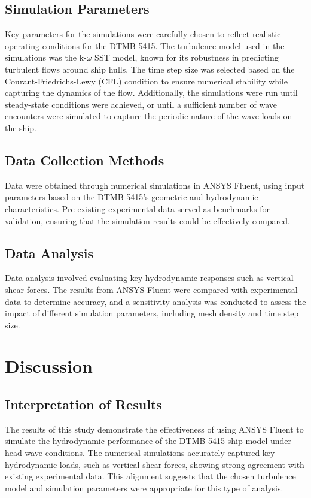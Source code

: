 \documentclass[12pt]{article} %
\begin{document}
\subsection{Simulation Parameters}
Key parameters for the simulations were carefully chosen to reflect realistic operating conditions 
for the DTMB 5415. The turbulence model used in the simulations was the k-$\omega$ SST model, known for its 
robustness in predicting turbulent flows around ship hulls. The time step size was selected based on 
the Courant-Friedrichs-Lewy (CFL) condition to ensure numerical stability while capturing the dynamics 
of the flow. Additionally, the simulations were run until steady-state conditions were achieved, or until 
a sufficient number of wave encounters were simulated to capture the periodic nature of the wave loads 
on the ship.

\subsection{Data Collection Methods}
Data were obtained through numerical simulations in ANSYS Fluent, using input parameters based on the 
DTMB 5415’s geometric and hydrodynamic characteristics. Pre-existing experimental data served as 
benchmarks for validation, ensuring that the simulation results could be effectively compared.

\subsection{Data Analysis}
Data analysis involved evaluating key hydrodynamic responses such as vertical shear forces. The results from ANSYS Fluent were compared with experimental data to determine accuracy, 
and a sensitivity analysis was conducted to assess the impact of different simulation parameters, 
including mesh density and time step size.








\clearpage
\section{Discussion}

\subsection{Interpretation of Results}
The results of this study demonstrate the effectiveness of using ANSYS Fluent to simulate the 
hydrodynamic performance of the DTMB 5415 ship model under head wave conditions. The numerical 
simulations accurately captured key hydrodynamic loads, such as vertical shear forces, showing strong 
agreement with existing experimental data. This alignment suggests that the 
chosen turbulence model and simulation parameters were appropriate for this type of analysis. 
\end{document}
